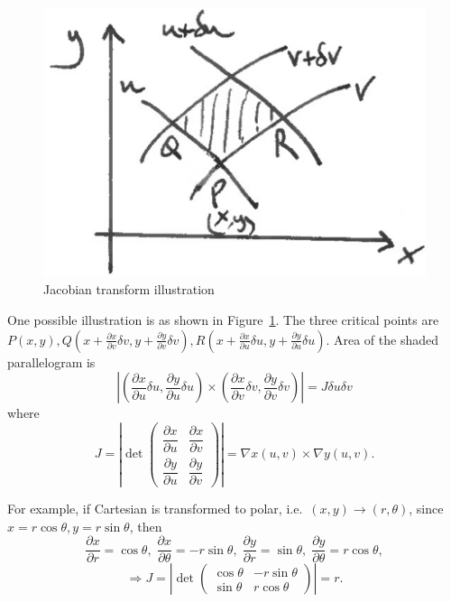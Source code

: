 \documentclass[12pt]{report}
\theoremstyle{definition}
\begin{document}
\begin{figure}
  	\includegraphics[scale=0.15]{JacobianTransform.jpeg}
  	\centering
    \caption{Jacobian transform illustration}\label{fig:Jacobian}
\end{figure}


One possible illustration is as shown in Figure~\ref{fig:Jacobian}.
The three critical points are $P(x,y), Q\left(x+\frac{\partial x}{\partial v}\delta v, 
y + \frac{\partial y}{\partial v}\delta v\right), 
R\left(x + \frac{\partial x}{\partial u}\delta u, y+\frac{\partial y}{\partial u}\delta u\right)$.
Area of the shaded parallelogram is\[
    \left|\left(\frac{\partial x}{\partial u}\delta u, 
    \frac{\partial y}{\partial u}\delta u\right)
    \times\left(\frac{\partial x}{\partial v}\delta v,
    \frac{\partial y}{\partial v}\delta v\right)\right|
    = J \delta u \delta v
\]where\[
J = \left|\det{\begin{pmatrix}
        \dfrac{\partial x}{\partial u} & \dfrac{\partial x}{\partial v} \\[2ex]
        \dfrac{\partial y}{\partial u} & \dfrac{\partial y}{\partial v}
\end{pmatrix} }\right|
= \nabla x(u,v) \times \nabla y(u,v).
\]

For example, if Cartesian is transformed to polar, i.e.\ $(x,y)\rightarrow{}(r,\theta)$,
since $x=r\cos{\theta}, y=r\sin{\theta}$, then\[
    \frac{\partial x}{\partial r}=\cos{\theta},\;
    \frac{\partial x}{\partial \theta}=-r\sin{\theta},\;
    \frac{\partial y}{\partial r}=\sin{\theta},\;
    \frac{\partial y}{\partial \theta}=r\cos{\theta},
\]\[
\Rightarrow{}J = \left|\det{\begin{pmatrix}
        \cos{\theta} & -r\sin{\theta} \\
        \sin{\theta} & r\cos{\theta}
\end{pmatrix} }\right| = r.
\]
\end{document}
